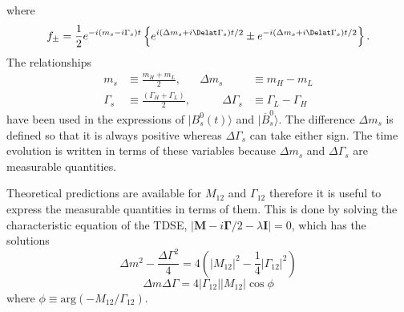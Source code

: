 {%
where 
\begin{equation}
f_{\pm} = \frac{1}{2} e^{-i(m_s - i\Gamma_s)t} \left \{ e^{i(\Delta m_s + i \Delat\Gamma_s)t/2} \pm e^{-i(\Delta m_s + i \Delat\Gamma_s)t/2} \right \}.
\end{equation}
The relationships
\begin{align}
m_s &\equiv \frac{m_H + m_L}{2}, &  \Delta m_s &\equiv m_H - m_L\\
\Gamma_s &\equiv \frac{(\Gamma_H + \Gamma_L)}{2}, & \qquad \Delta \Gamma_s &\equiv \Gamma_L - \Gamma_H
\label{eq:deltas}
\end{align}
have been used in the expressions of $|B^{0}_{s}(t)\rangle$ and $|\overline{B}^{0}_{s} \rangle$. The difference $\Delta m_s$ is defined so that it is always positive whereas $\Delta\Gamma_s$ can take either sign. The time evolution is written in terms of these variables because $\Delta m_s$ and $\Delta\Gamma_s$ are measurable quantities.

Theoretical predictions are available for $M_{12}$ and $\Gamma_{12}$ therefore it is useful to express the measurable quantities in terms of them. This is done by solving the characteristic equation of the TDSE, $|\mathbf{M} - i \mathbf{\Gamma}/2 - \lambda \mathbf{I}| = 0$, which has the solutions
\begin{equation}
\Delta m^2 - \frac{\Delta\Gamma^2}{4} = 4(|M_{12}|^2 - \frac{1}{4} |\Gamma_{12}|^2) 
\end{equation}
\begin{equation}
\Delta m \Delta \Gamma = 4 |\Gamma_{12}| |M_{12}| \cos \phi
\end{equation}
where $\phi \equiv \mathrm{arg}(-M_{12}/\Gamma_{12})$.

}
